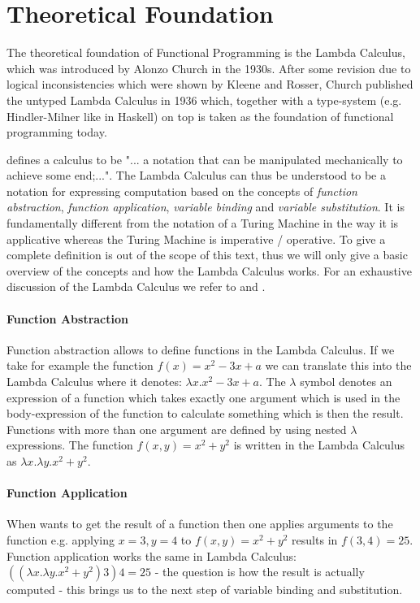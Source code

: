 \section{Theoretical Foundation}
The theoretical foundation of Functional Programming is the Lambda Calculus, which was introduced by Alonzo Church in the 1930s. After some revision due to logical inconsistencies which were shown by Kleene and Rosser, Church published the untyped Lambda Calculus in 1936 which, together with a type-system (e.g. Hindler-Milner like in Haskell) on top is taken as the foundation of functional programming today.

\cite{maclennan_functional_1990} defines a calculus to be "... a notation that can be manipulated mechanically to achieve some end;...". The Lambda Calculus can thus be understood to be a notation for expressing computation based on the concepts of \textit{function abstraction}, \textit{function application}, \textit{variable binding} and \textit{variable substitution}. It is fundamentally different from the notation of a Turing Machine in the way it is applicative whereas the Turing Machine is imperative / operative. To give a complete definition is out of the scope of this text, thus we will only give a basic overview of the concepts and how the Lambda Calculus works. For an exhaustive discussion of the Lambda Calculus we refer to \cite{maclennan_functional_1990} and \cite{barendregt_lambda_1984}.

\paragraph{Function Abstraction}
Function abstraction allows to define functions in the Lambda Calculus. If we take for example the function $f(x) = x^2 - 3x + a$ we can translate this into the Lambda Calculus where it denotes: $\lambda x.x^2 - 3x + a$. The $\lambda$ symbol denotes an expression of a function which takes exactly one argument which is used in the body-expression of the function to calculate something which is then the result. Functions with more than one argument are defined by using nested $\lambda$ expressions. The function $f(x, y) = x^2 + y^2$ is written in the Lambda Calculus as $\lambda x.\lambda y.x^2 + y^2$.

\paragraph{Function Application}
When wants to get the result of a function then one applies arguments to the function e.g. applying $x = 3, y = 4$ to $f(x, y) = x^2 + y^2$ results in $f(3, 4) = 25$. Function application works the same in Lambda Calculus: $((\lambda x.\lambda y.x^2 + y^2) 3) 4 = 25$ - the question is how the result is actually computed - this brings us to the next step of variable binding and substitution.

